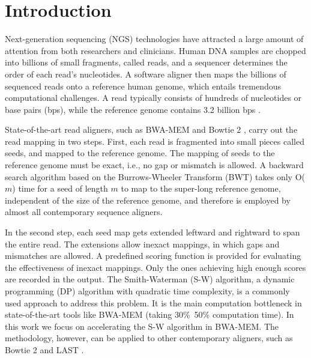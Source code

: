 \section{Introduction} 
\label{sec:introduction}

Next-generation sequencing (NGS) technologies have attracted a large amount of attention from both researchers and clinicians. 
Human DNA samples are chopped into billions of small fragments, called reads, and a sequencer determines the order of each read's nucleotides. 
A software aligner then maps the billions of sequenced reads onto a reference human genome, which entails tremendous computational challenges.
A read typically consists of hundreds of nucleotides or base pairs (bps), while the reference genome contains 3.2 billion bps \cite{Mardis2008}.

State-of-the-art read aligners, such as BWA-MEM \cite{BWA-MEM} and Bowtie 2 \cite{Bowtie2}, 
carry out the read mapping in two steps. 
First, each read is fragmented into small pieces called seeds, and mapped to the reference genome. 
The mapping of seeds to the reference genome must be exact, i.e., no gap or mismatch is allowed. 
A backward search algorithm based on the Burrows-Wheeler Transform (BWT) \cite{BWT} takes only O($m$) time for a seed of length $m$ to map to the super-long reference genome, independent of the size of the reference genome, and therefore is employed by almost all contemporary sequence aligners.

In the second step, each seed map gets extended leftward and rightward to span the entire read. 
The extensions allow inexact mappings, in which gaps and mismatches are allowed. A predefined scoring function is provided for evaluating the effectiveness of inexact mappings. Only the ones achieving high enough scores are recorded in the output. 
The Smith-Waterman (S-W) algorithm, a dynamic programming (DP) algorithm with quadratic time complexity, is a commonly used approach to address this problem. 
It is the main computation bottleneck in state-of-the-art tools like BWA-MEM \cite{BWA-MEM} (taking 30\%~50\% computation time). 
In this work we focus on accelerating the S-W algorithm in BWA-MEM. The methodology, however, can be applied to other contemporary aligners, such as Bowtie 2 \cite{Bowtie2} and LAST \cite{LAST}. 

